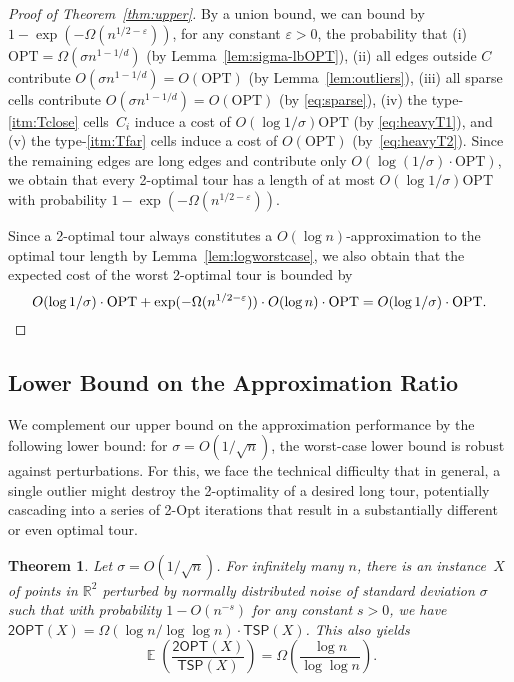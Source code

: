 \documentclass[11pt,DIV=12,a4paper]{scrartcl}
\newtheorem{theorem}[claim]{Theorem}
\newcommand{\real}{\ensuremath{\mathbb{R}}}
\DeclareMathOperator{\expected}{\mathbb{E}}
\newcommand{\itemref}[1]{\ref{itm:#1}}
\newcommand{\TSP}{\mathsf{TSP}}
\newcommand{\TwoOPT}{\mathsf{2OPT}}
\newcommand{\OPT}{\mathrm{OPT}}
\begin{document}
\begin{proof}[Proof of Theorem~\ref{thm:upper}]
By a union bound, we can bound by $1-\exp(-\Omega(n^{1/2-\varepsilon}))$, for any constant $\varepsilon>0$, the probability that (i) $\OPT=\Omega(\sigma n^{1-1/d})$ (by Lemma~\ref{lem:sigma-lbOPT}), (ii) all edges outside $C$ contribute $O(\sigma n^{1-1/d})=O(\OPT)$ (by Lemma~\ref{lem:outliers}), (iii) all sparse cells contribute $O(\sigma n^{1-1/d})=O(\OPT)$ (by \eqref{eq:sparse}), (iv) the type-\itemref{Tclose} cells~$C_i$ induce a cost of $O(\log 1/\sigma) \OPT$ (by \eqref{eq:heavyT1}), and (v) the type-\itemref{Tfar} cells induce a cost of $O(\OPT)$ (by~\eqref{eq:heavyT2}). Since the remaining edges are long edges and contribute only $O(\log(1/\sigma) \cdot \OPT)$, we obtain that every 2-optimal tour has a length of at most $O(\log 1/\sigma) \OPT$ with probability $1-\exp(-\Omega(n^{1/2-\varepsilon}))$. 

Since a 2-optimal tour always constitutes a $O(\log n)$-approximation to the optimal tour length by Lemma~\ref{lem:logworstcase}, we also obtain that the expected cost of the worst 2-optimal tour is bounded by 
\[
  O(\log 1/\sigma)\cdot \OPT + \exp(-\Omega(n^{1/2-\varepsilon})) \cdot O(\log n) \cdot \OPT = O(\log 1/\sigma) \cdot \OPT. \qedhere\] 
\end{proof}


\subsection{Lower Bound on the Approximation Ratio}
\label{sec:lb}


We complement our upper bound on the approximation performance by the following lower bound: for $\sigma = O(1/\sqrt{n})$, the worst-case lower bound is robust against perturbations. For this, we face the technical difficulty that in general, a single outlier might destroy the 2-optimality of a desired long tour, potentially cascading into a series of 2-Opt iterations that result in a substantially different or even optimal tour. 

\begin{theorem}\label{thm:2optlb}
Let $\sigma = O(1/\sqrt{n})$. For infinitely many $n$, there is an instance~$X$ of points in $\real^2$ perturbed by normally distributed noise of standard deviation $\sigma$ such that with probability $1-O(n^{-s})$ for any constant $s>0$, we have $\TwoOPT(X) = \Omega(\log n/\log \log n) \cdot \TSP(X)$. This also yields
\[ \expected\left(\frac{\TwoOPT(X)}{\TSP(X)}\right) = \Omega\left(\frac{\log n}{\log \log n}\right).\]
\end{theorem}
\end{document}
